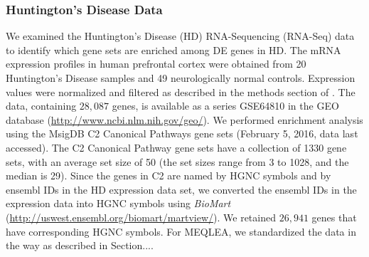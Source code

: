 \documentclass[useAMS,usenatbib, galley]{biom}
\newcommand{\OurMethod}{MEQLEA}
\begin{document}
	\subsubsection{Huntington's Disease Data}
	We examined the Huntington's Disease (HD) RNA-Sequencing (RNA-Seq) data \citep{labadorf2015rna}  to identify which gene sets are enriched among DE genes in HD. The mRNA expression profiles in human prefrontal cortex were obtained from 20 Huntington's Disease samples and 49 neurologically normal controls.  Expression values were normalized and filtered as described in the methods section of \cite{labadorf2015rna}.
	The data, containing $28,087$ genes, is available as a series GSE64810 in the GEO database (\url{http://www.ncbi.nlm.nih.gov/geo/}). We performed enrichment analysis using the MsigDB \citep{subramanian2005gene} C2 Canonical Pathways gene sets (February 5, 2016, data last accessed). The C2 Canonical Pathway gene sets have a collection of 1330 gene sets, with an average set size of 50 (the set sizes range from 3 to 1028, and the median is 29). Since the genes in C2 are named by HGNC symbols and by ensembl IDs in the HD expression data set, we converted the ensembl IDs in the expression data into HGNC symbols using \textit{BioMart} (\url{http://uswest.ensembl.org/biomart/martview/}). We retained $26,941$ genes that have corresponding HGNC symbols. For \OurMethod, we standardized the data in the way as described in Section....
	
\end{document}
